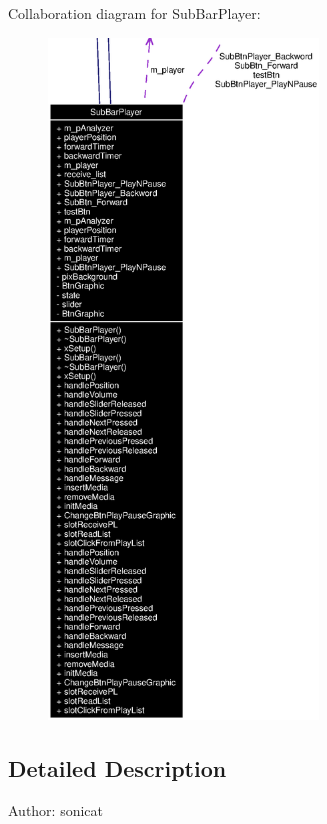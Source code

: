 Collaboration diagram for Sub\-Bar\-Player:\begin{figure}[H]
\begin{center}
\leavevmode
\includegraphics[width=203pt]{classSubBarPlayer__coll__graph}
\end{center}
\end{figure}


\subsection{Detailed Description}
\begin{Desc}
\item[Author:]sonicat \end{Desc}




